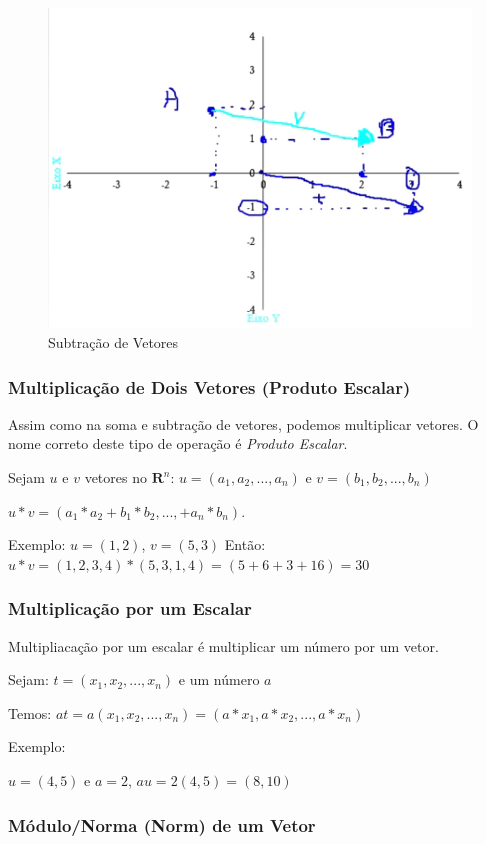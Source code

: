 \documentclass[12pt]{article}
\begin{document}
\begin{figure}
	\centering
	\includegraphics[width=0.7\linewidth]{figuras/subtracao_vetores_01}
	\caption[Subtração de Vetores]{Subtração de Vetores}
	\label{fig:subtracaovetores01}
\end{figure}

\subsubsection{Multiplicação de Dois Vetores (Produto Escalar)}

Assim como na soma e subtração de vetores, podemos multiplicar vetores. O nome correto deste tipo de operação é \textit{Produto Escalar}.

Sejam \(u\) e \(v\) vetores no \( \mathbf{R}^{n}\): \(u=(a_{1}, a_{2},...,a_{n})\) e \(v=(b_{1}, b_{2},...,b_{n})\)

\(u*v = (a_{1} * a_{2} + b_{1} * b_{2} ,..., + a_{n} * b_{n})\).

Exemplo: \(u = (1,2)\), \(v = (5, 3)\)
Então: \(u*v = (1, 2, 3, 4) * (5, 3, 1, 4) = (5 + 6 + 3 + 16) = 30\)

\subsubsection{Multiplicação por um Escalar}

Multipliacação por um escalar é multiplicar um número por um vetor.

Sejam: \(t = (x_{1}, x_{2}, ..., x_{n})\) e um número \(a\)

Temos: \(at = a(x_{1}, x_{2}, ..., x_{n}) = (a*x_{1}, a*x_{2}, ..., a*x_{n})\)

Exemplo:

\(u = (4, 5)\) e \(a = 2\), \(au = 2(4, 5) = (8, 10)\)

\subsubsection{Módulo/Norma (Norm) de um Vetor}
\end{document}
